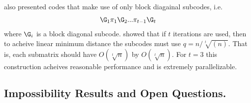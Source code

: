 \cite{parallelPCG} also presented codes that make use of only block diagainal subcodes, i.e.
$$
\G_1\pi_1 \G_2 ... \pi_{t-1} \G_t
$$
where $\G_i$ is a block diagonal subcode. \cite{parallelPCG} showed that if $t$ iterations are used, then to acheive linear minimum distance the subcodes must use $q=n/\sqrt[t]{(n)}$. That is, each submatrix should have $O(\sqrt[t]{n})$ by $O(\sqrt[t]{n})$. For $t=3$ this construction acheives reasonable performance and is extremely parallelizable.

\subsection{Impossibility Results and Open Questions.}


